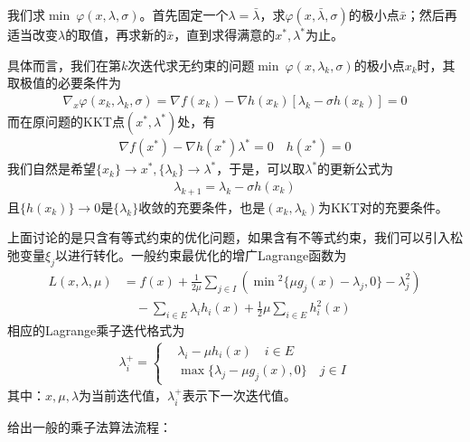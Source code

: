         我们求$\mathop {\min}\ \varphi(x,{\lambda},\sigma)$。首先固定一个$\lambda=\bar{\lambda}$，求$\varphi(x,\bar{\lambda},\sigma)$的极小点$\bar{x}$；然后再适当改变$\lambda$的取值，再求新的$\bar{x}$，直到求得满意的$x^*,{\lambda}^*$为止。
        \par
        具体而言，我们在第$k$次迭代求无约束的问题$\mathop {\min}\ \varphi(x,{\lambda}_k,\sigma)$的极小点$x_k$时，其取极值的必要条件为
        \begin{align*}
        {\nabla}_x\varphi(x_k,{\lambda}_k,{\sigma})={\nabla}f(x_k)-{\nabla}h(x_k)[{\lambda}_k-{\sigma}h(x_k)]=0
        \end{align*}
        而在原问题的KKT点$(x^*,{\lambda}^*)$处，有
        \begin{align*}
        {\nabla}f(x^*)-\nabla h(x^*){\lambda}^*=0\quad h(x^*)=0
        \end{align*}
        我们自然是希望$\{x_k\} \to x^*,\{{\lambda}_k\} \to {\lambda}^*$，于是，可以取${\lambda}^*$的更新公式为
        \begin{align*}
        {\lambda}_{k+1}={\lambda}_k-{\sigma}h(x_k)
        \end{align*}
        且$\{h(x_k)\} \to 0$是$\{{\lambda}_k\}$收敛的充要条件，也是$(x_k,{\lambda}_k)$为KKT对的充要条件。
        \par
        上面讨论的是只含有等式约束的优化问题，如果含有不等式约束，我们可以引入松弛变量${\xi}_j$以进行转化。一般约束最优化的增广Lagrange函数为
        \begin{align*}
        L(x,\lambda,\mu)&=f(x)+\frac{1}{2\mu}\mathop {\sum}\limits_{j \in I}\left( \mathop{\min}{}^2\{\mu g_j(x)-{\lambda}_j,0\}-{\lambda}_j^2 \right)  \\
        &\quad -\mathop {\sum}\limits_{i \in E}{\lambda}_ih_i(x)+ \frac {1}{2}\mu\mathop {\sum}\limits_{i \in E}h_i^2(x)
        \end{align*}
        相应的Lagrange乘子迭代格式为
        \begin{align*}
        {\lambda}_i^{+} = \left\{
        \begin{aligned}
        &{\lambda}_i-\mu h_i(x)\quad i \in E\\
        &\mathop {\max}\{{\lambda}_j-\mu g_j(x),0\}\quad j\in I
        \end{aligned}
        \right.
        \end{align*}
        其中：$x,\mu,\lambda$为当前迭代值，${\lambda}_i^{+}$表示下一次迭代值。
        \par
        给出一般的乘子法算法流程：\\
